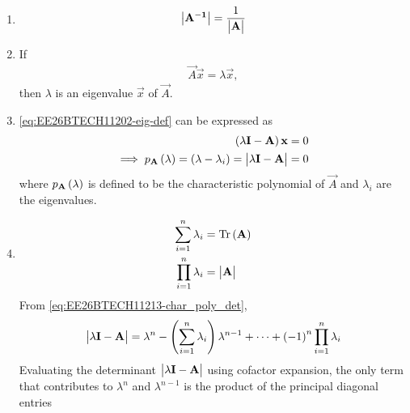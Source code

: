 \begin{enumerate}[label=\thesubsection.\arabic*, ref=\thesubsection.\theenumi]
\begin{align}
&= \mydet{\vec{E}_1} \mydet{\vec{E}_2} \cdots \mydet{\vec{E}_k} \mydet{\vec{B}}
\label{eq:EE26BTECH11202-Matrices_1-AB} 
\end{align}
For $\vec{B}=\vec{I}$, 
\begin{align}
\mydet{\vec{A}} = \mydet{\vec{E}_1} \mydet{\vec{E}_2} \cdots \mydet{\vec{E}_k}
\end{align}
which upon substituting in 
\eqref{eq:EE26BTECH11202-Matrices_1-AB} 
yields
\begin{align}
	\mydet{\vec{A}\vec{B}} = \mydet{\vec{A}}\mydet{\vec{B}} \label{eq:EE26BTECH11202-product_determinant}
\end{align}
\item 
\begin{align}
\begin{vmatrix}\mathbf{A^{-1}}\end{vmatrix} = \frac{1}{\begin{vmatrix}\mathbf{A}\end{vmatrix}} \label{eq:EE26BTECH11202-Matrices_inverse}
\end{align}
\item If
\begin{align}
\vec{A}
\vec{x}
=\lambda\vec{x},
\label{eq:EE26BTECH11202-eig-def}
\end{align}
then 
	$\lambda$ is an eigenvalue 
$\vec{x}$
of 
$\vec{A}$.
\item 
\eqref{eq:EE26BTECH11202-eig-def}
	can be expressed as
\begin{align}
\begin{split}
	\left(\lambda \mathbf{I} - \mathbf{A}\right)\mathbf{x} = 0
	\\
\implies p_{\mathbf{A}}\left(\lambda\right) =
	\left(\lambda -\lambda_i\right) = 
\begin{vmatrix}\lambda \mathbf{I} - \mathbf{A}\end{vmatrix} = 0
\end{split}
 \label{eq:EE26BTECH11213-char_poly_det}
\end{align}
	where $p_{\mathbf{A}}\left(\lambda\right)$ is defined to be the characteristic polynomial of $\vec{A}$ and $\lambda_i$ are the eigenvalues. 
%
\item 
\begin{align}
	\sum_{i=1}^{n} \lambda_i &= \text{Tr}\left(\mathbf{A}\right) 
	\label{eq:EE26BTECH11202-Matrices_2}
	\\
	\prod_{i=1}^{n} \lambda_i &= \begin{vmatrix}\mathbf{A}\end{vmatrix} \label{eq:EE26BTECH11202-Matrices_3}
\end{align}
\solution
	From \eqref{eq:EE26BTECH11213-char_poly_det},
\begin{align}
	\begin{vmatrix}\lambda \mathbf{I} - \mathbf{A}\end{vmatrix} 
 = \lambda^n - \left(\sum_{i=1}^n \lambda_i\right) \lambda^{n-1} + \dots + \left(-1\right)^n \prod_{i=1}^n \lambda_i \label{eq:EE26BTECH11213-char_poly_factored}
\end{align}
Evaluating the determinant $\begin{vmatrix}\lambda \mathbf{I} - \mathbf{A}\end{vmatrix}$ using cofactor expansion, the only term that contributes to $\lambda^n$ and $\lambda^{n-1}$ is the product of the principal diagonal entries

\end{enumerate}

